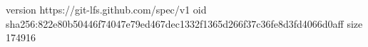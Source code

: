version https://git-lfs.github.com/spec/v1
oid sha256:822e80b50446f74047e79ed467dec1332f1365d266f37c36fe8d3fd4066d0aff
size 174916
